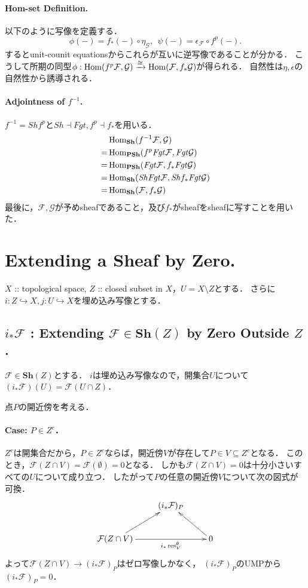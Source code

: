 \documentclass[a4paper]{jsarticle}
\newcommand{\shF}{\mathcal{F}}
\newcommand{\shG}{\mathcal{G}}
\newcommand{\Sh}{\mathbf{Sh}}
\newcommand{\PSh}{\mathbf{PSh}}
\newcommand{\ftorSh}{\mathit{Sh}}
\newcommand{\ftorFgt}{\mathit{Fgt}}
\newcommand{\res}{\operatorname{res}}
\begin{document}
    \paragraph{Hom-set Definition.}
    以下のように写像を定義する．
    \[
        \phi(-)=f_*(-) \circ \eta_{\shG},~~
        \psi(-)=\epsilon_{\shF} \circ f^p(-).
    \]
    するとunit-counit equationsからこれらが互いに逆写像であることが分かる．
    こうして所期の同型$\phi: \Hom(f^p\shF, \shG) \bimap \Hom(\shF, f_* \shG)$が得られる．
    自然性は$\eta, \epsilon$の自然性から誘導される．

    \paragraph{Adjointness of $f^{-1}$.}
    $f^{-1}=\ftorSh f^p$と$\ftorSh \dashv \ftorFgt, f^p \dashv f_*$を用いる．
    \begin{align*}
        {}& \Hom_{\Sh}(f^{-1} \shF, \shG) \\
        =&  \Hom_{\PSh}(f^p \ftorFgt \shF, \ftorFgt \shG) \\
        =&  \Hom_{\PSh}(\ftorFgt \shF, f_* \ftorFgt \shG) \\
        =&  \Hom_{\Sh}(\ftorSh \ftorFgt \shF, \ftorSh f_* \ftorFgt \shG) \\
        =&  \Hom_{\Sh}(\shF, f_* \shG)
    \end{align*}
    最後に，$\shF, \shG$が予めsheafであること，及び$f_*$がsheafをsheafに写すことを用いた．

\section{Extending a Sheaf by Zero.} %
    $X$ :: topological space, $Z$ :: closed subset in $X$，$U=X \setminus Z$とする．
    さらに$i: Z \hookrightarrow X, j: U \hookrightarrow X$を埋め込み写像とする．

    \subsection{$i_* \shF$ : Extending $\shF \in \Sh(Z)$ by Zero Outside $Z$.}
    $\shF \in \Sh(Z)$とする．
    $i$は埋め込み写像なので，開集合$U$について$(i_* \shF)(U)=\shF(U \cap Z)$．

    点$P$の開近傍を考える．

    \paragraph{Case: $P \in Z^c$．}
    $Z^c$は開集合だから，$P \in Z^c$ならば，開近傍$V$が存在して$P \in V \subseteq Z^c$となる．
    このとき，$\shF(Z \cap V)=\shF(\emptyset)=0$となる．
    しかも$\shF(Z \cap V)=0$は十分小さいすべての$U$について成り立つ．
    したがって$P$の任意の開近傍$V$について次の図式が可換．
    \[
    \xymatrix
    {
        {} & (i_* \shF)_P & {} \\
        \shF(Z \cap V) \ar[rr]_-{i_* \res_{V}^{\emptyset}} \ar[ur]& {} & 0 \ar[ul]\\
    }
    \]
    よって$\shF(Z \cap V) \to (i_* \shF)_P$はゼロ写像しかなく，
    $(i_* \shF)_P$のUMPから$(i_* \shF)_P=0$．
\end{document}

